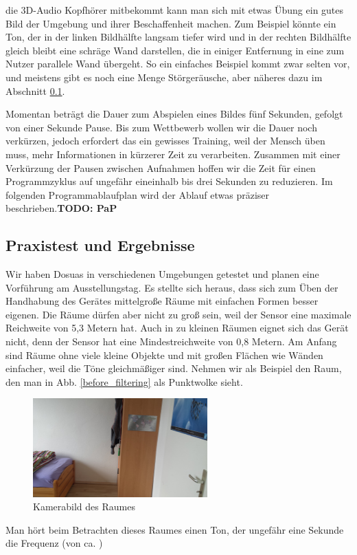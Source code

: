 \documentclass[a4paper,12pt,ngerman]{scrartcl}
\begin{document}
die 3D-Audio Kopfhörer mitbekommt kann man sich mit etwas Übung ein gutes Bild der Umgebung und ihrer
Beschaffenheit machen. Zum Beispiel könnte ein Ton, der in der linken Bildhälfte langsam tiefer wird und 
in der rechten Bildhälfte gleich bleibt eine schräge Wand darstellen, die in einiger Entfernung in eine
zum Nutzer parallele Wand übergeht. So ein einfaches Beispiel kommt zwar selten vor, und meistens gibt es
noch eine Menge Störgeräusche, aber näheres dazu im Abschnitt \ref{testsAndResults}.\par 
Momentan beträgt die Dauer zum Abspielen eines Bildes fünf Sekunden, gefolgt von einer Sekunde 
Pause. Bis zum Wettbewerb wollen wir die Dauer noch verkürzen, jedoch erfordert das ein gewisses 
Training, weil der Mensch üben muss, mehr Informationen in kürzerer Zeit zu verarbeiten. Zusammen mit 
einer Verkürzung der Pausen zwischen Aufnahmen hoffen wir die Zeit für einen Programmzyklus auf ungefähr
eineinhalb bis drei Sekunden zu reduzieren. Im folgenden Programmablaufplan wird der Ablauf etwas 
präziser beschrieben.\textbf{TODO: PaP} \newline

\subsection{Praxistest und Ergebnisse} \label{testsAndResults}

Wir haben Dosuas in verschiedenen Umgebungen getestet und planen eine Vorführung am Ausstellungstag.
Es stellte sich heraus, dass sich zum Üben der Handhabung des Gerätes mittelgroße Räume mit einfachen
Formen besser eigenen. Die Räume dürfen aber nicht zu groß sein, weil der Sensor eine maximale Reichweite
von 5,3 Metern hat. Auch in zu kleinen Räumen eignet sich das Gerät nicht, denn der Sensor hat eine  Mindestreichweite von 0,8 Metern. Am Anfang sind Räume ohne viele kleine Objekte und mit großen 
Flächen wie Wänden einfacher, weil die Töne gleichmäßiger sind.
Nehmen wir als Beispiel den Raum, den man in Abb. \ref{before_filtering} als Punktwolke sieht. 
\begin{figure}[h]
	\centering
	\includegraphics[angle=180,width=0.6\textwidth]{20180120_114953}
	\caption{Kamerabild des Raumes}
	\label{normal_picture}
\end{figure}
\par
Man hört beim Betrachten dieses Raumes einen Ton, der ungefähr eine Sekunde die Frequenz (von ca.  )
\end{document}
